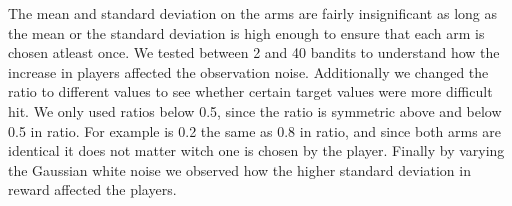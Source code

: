 The mean and standard deviation on the arms are fairly insignificant as long as the mean or the standard deviation is high enough to ensure that each arm is chosen atleast once. We tested between 2 and 40 bandits to understand how the increase in players affected the observation noise. Additionally we changed the ratio to different values to see whether certain target values were more difficult hit. We only used ratios below 0.5, since the ratio is symmetric above and below 0.5 in ratio. For example is 0.2 the same as 0.8 in ratio, and since both arms are identical it does not matter witch one is chosen by the player. Finally by varying the Gaussian white noise we observed how the higher standard deviation in reward affected the players.




% 
% 
% 
% 
% 
% 
% 
% 
% 
% 
% 
